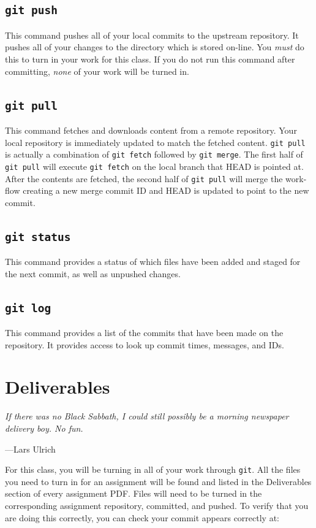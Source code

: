 \documentclass[11pt]{article}
\begin{document}
\subsection{\texttt{git push}}
This command pushes all of your local commits to the upstream repository. It
pushes all of your changes to the directory which is stored on-line. You \emph{must} do this to turn in your work for this class. If you do not run this command after committing, \emph{none} of your work will be turned in.

\subsection{\texttt{git pull}} This command fetches and downloads content from a remote repository. Your local repository is immediately updated to match the fetched content. \texttt{git pull} is actually a combination of \texttt{git fetch} followed by \texttt{git merge}. The first half of \texttt{git pull} will execute \texttt{git fetch} on the local branch that HEAD is pointed at. After the contents are fetched, the second half of \texttt{git pull} will merge the work-flow creating a new merge commit ID and HEAD is updated to point to the new commit.


\subsection{\texttt{git status}}
This command provides a status of which files have been added and staged for the next commit, as well as unpushed changes.

\subsection{\texttt{git log}}
This command provides a list of the commits that have been made on the repository. It provides access to look up commit times, messages, and IDs.


\section{Deliverables}
\epigraph{\emph{If there was no Black Sabbath, I could still possibly be a
morning newspaper delivery boy. No fun.}}{---Lars Ulrich}

\noindent For this class, you will be turning in all of your work
through \texttt{git}. All the files you need to turn in for an
assignment will be found and listed in the Deliverables section of
every assignment PDF. Files will need to be turned in the corresponding
assignment repository, committed, and pushed. To verify that you
are doing this correctly, you can check your commit appears correctly
at:
\end{document}
